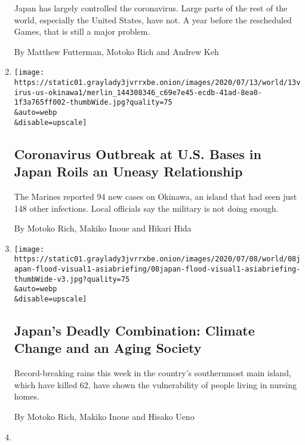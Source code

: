 \begin{enumerate}
  Japan has largely controlled the coronavirus. Large parts of the rest
  of the world, especially the United States, have not. A year before
  the rescheduled Games, that is still a major problem.

  By Matthew Futterman, Motoko Rich and Andrew Keh
\item
  \href{/2020/07/13/world/asia/coronavirus-military-okinawa.html}{}

  \texttt{[image: https://static01.graylady3jvrrxbe.onion/images/2020/07/13/world/13virus-us-okinawa1/merlin\_144308346\_c69e7e45-ecdb-41ad-8ea0-1f3a765ff002-thumbWide.jpg?quality=75\\\&auto=webp\\\&disable=upscale]}

  \hypertarget{coronavirus-outbreak-at-us-bases-in-japan-roils-an-uneasy-relationship}{%
  \subsection{Coronavirus Outbreak at U.S. Bases in Japan Roils an
  Uneasy
  Relationship}\label{coronavirus-outbreak-at-us-bases-in-japan-roils-an-uneasy-relationship}}

  The Marines reported 94 new cases on Okinawa, an island that had seen
  just 148 other infections. Local officials say the military is not
  doing enough.

  By Motoko Rich, Makiko Inoue and Hikari Hida
\item
  \href{/2020/07/09/world/asia/japan-climate-change-rains-elderly.html}{}

  \texttt{[image: https://static01.graylady3jvrrxbe.onion/images/2020/07/08/world/08japan-flood-visual1-asiabriefing/08japan-flood-visual1-asiabriefing-thumbWide-v3.jpg?quality=75\\\&auto=webp\\\&disable=upscale]}

  \hypertarget{japans-deadly-combination-climate-change-and-an-aging-society}{%
  \subsection{Japan's Deadly Combination: Climate Change and an Aging
  Society}\label{japans-deadly-combination-climate-change-and-an-aging-society}}

  Record-breaking rains this week in the country's southernmost main
  island, which have killed 62, have shown the vulnerability of people
  living in nursing homes.

  By Motoko Rich, Makiko Inoue and Hisako Ueno
\item
  \href{/es/2020/07/06/espanol/mundo/racismo-japon-protestas.html}{}


\end{enumerate}
